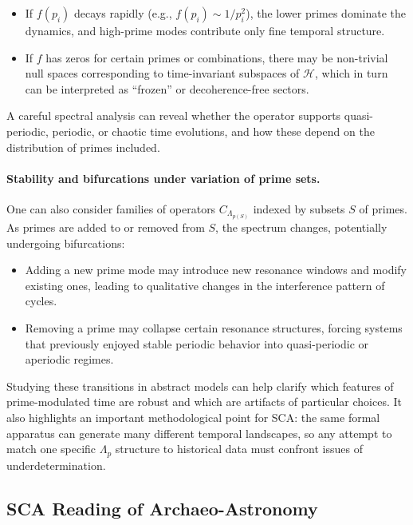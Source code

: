 \documentclass[12]{amsart}
\theoremstyle{plain}
\begin{document}
\begin{itemize}
  \item If $f(p_i)$ decays rapidly (e.g., $f(p_i) \sim 1/p_i^2$), the lower primes dominate the dynamics, and high-prime modes contribute only fine temporal structure.
  \item If $f$ has zeros for certain primes or combinations, there may be non-trivial null spaces corresponding to time-invariant subspaces of $\mathcal{H}$, which in turn can be interpreted as ``frozen'' or decoherence-free sectors.
\end{itemize}

A careful spectral analysis can reveal whether the operator supports quasi-periodic, periodic, or chaotic time evolutions, and how these depend on the distribution of primes included.

\paragraph{Stability and bifurcations under variation of prime sets.} One can also consider families of operators $C_{\Lambda_{p(S)}}$ indexed by subsets $S$ of primes. As primes are added to or removed from $S$, the spectrum changes, potentially undergoing bifurcations:

\begin{itemize}
  \item Adding a new prime mode may introduce new resonance windows and modify existing ones, leading to qualitative changes in the interference pattern of cycles.
  \item Removing a prime may collapse certain resonance structures, forcing systems that previously enjoyed stable periodic behavior into quasi-periodic or aperiodic regimes.
\end{itemize}

Studying these transitions in abstract models can help clarify which features of prime-modulated time are robust and which are artifacts of particular choices. It also highlights an important methodological point for SCA: the same formal apparatus can generate many different temporal landscapes, so any attempt to match one specific $\Lambda_p$ structure to historical data must confront issues of underdetermination.

\subsection{SCA Reading of Archaeo-Astronomy}
\end{document}

